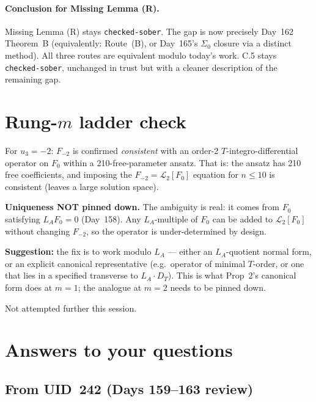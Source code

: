 \documentclass[11pt]{amsart}
\begin{document}
\paragraph{Conclusion for Missing Lemma (R).}
Missing Lemma (R) stays \texttt{checked-sober}. The gap is now precisely
Day~162 Theorem~B (equivalently: Route~(B), or Day~165's $\Sigma_0$ closure
via a distinct method). All three routes are equivalent modulo today's
work. C.5 stays \texttt{checked-sober}, unchanged in trust but with a
cleaner description of the remaining gap.

\section{Rung-$m$ ladder check}
\label{sec:rungm}

For $u_3 = -2$: $F_{-2}$ is confirmed \emph{consistent} with an
order-2 $T$-integro-differential operator on $F_0$ within a 210-free-parameter
ansatz. That is: the ansatz has 210 free coefficients, and imposing the
$F_{-2} = \mathcal L_2[F_0]$ equation for $n \le 10$ is consistent (leaves a
large solution space).

\textbf{Uniqueness NOT pinned down.} The ambiguity is real: it comes from
$F_0$ satisfying $L_A F_0 = 0$ (Day~158). Any $L_A$-multiple of $F_0$ can be
added to $\mathcal L_2[F_0]$ without changing $F_{-2}$, so the operator is
under-determined by design.

\textbf{Suggestion:} the fix is to work modulo $L_A$ --- either an
$L_A$-quotient normal form, or an explicit canonical representative
(e.g.\ operator of minimal $T$-order, or one that lies in a specified
transverse to $L_A \cdot D_T$). This is what Prop~2's canonical form does at
$m = 1$; the analogue at $m = 2$ needs to be pinned down.

Not attempted further this session.

\section{Answers to your questions}
\label{sec:answers}

\subsection{From UID~242 (Days 159--163 review)}
\end{document}
